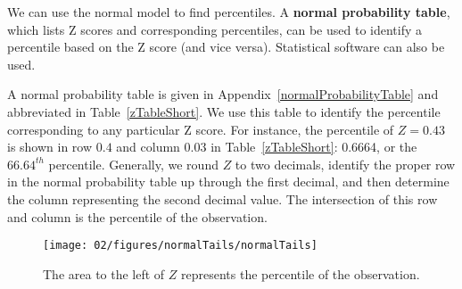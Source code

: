 We can use the normal model to find percentiles. A \textbf{normal probability table}, which lists Z scores and corresponding percentiles, can be used to identify a percentile based on the Z score (and vice versa). Statistical software can also be used.

A normal probability table is given in Appendix~\vref{normalProbabilityTable} and abbreviated in Table~\ref{zTableShort}. We use this table to identify the percentile corresponding to any particular Z score. For instance, the percentile of $Z=0.43$ is shown in row $0.4$ and column $0.03$ in Table~\ref{zTableShort}: 0.6664, or the $66.64^{th}$ percentile. Generally, we round $Z$ to two decimals, identify the proper row in the normal probability table up through the first decimal, and then determine the column representing the second decimal value. The intersection of this row and column is the percentile of the observation.

\begin{figure}
\centering
\texttt{[image: 02/figures/normalTails/normalTails]}
\caption{The area to the left of $Z$ represents the percentile of the observation.}
\label{normalTails}
\end{figure}

